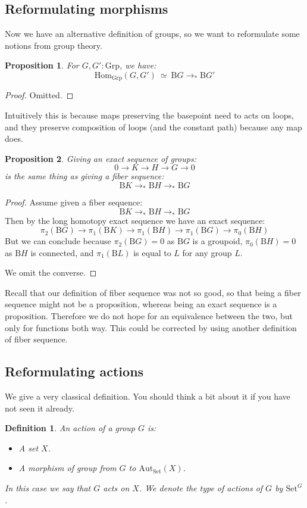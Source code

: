 \documentclass{article}
\newcommand{\sse}[1]{\medbreak \subsection{#1}}
\renewcommand{\r}{\rightarrow}
\newcommand{\Grp}{\mathrm{Grp}}
\newcommand{\Hom}{\mathrm{Hom}}
\newcommand{\B}{\mathrm{B}}
\newcommand{\Aut}{\mathrm{Aut}}
\newcommand{\Set}{\mathrm{Set}}
\newtheorem{definition}{Definition}
\newtheorem{proposition}{Proposition}
\begin{document}
\sse{Reformulating morphisms}

Now we have an alternative definition of groups, so we want to reformulate some notions from group theory.

\begin{proposition}
For $G,G':\Grp$, we have:
\[\Hom_\Grp(G,G') \ \simeq \ \B G\r_* \B G'\]
\end{proposition}
\begin{proof}
Omitted.
\end{proof}

Intuitively this is because maps preserving the basepoint need to acts on loops, and they preserve composition of loops (and the constant path) because any map does.

\begin{proposition}
Giving an exact sequence of groups:
\[0\r K \r H\r  G\r 0 \]
is the same thing as giving a fiber sequence:
\[\B K \r_*\B H\r_*\B G\]
\end{proposition}
\begin{proof}
Assume given a fiber sequence:
\[\B K \r_*\B H\r_*\B G\]
Then by the long homotopy exact sequence we have an exact sequence:
\[\pi_2(\B G)\r \pi_1(\B K) \r \pi_1(\B H) \r \pi_1(\B G) \r \pi_0(\B H)\]
But we can conclude because $\pi_2(\B G) = 0$ as $\B G$ is a groupoid, $\pi_0(\B H) = 0$ as $\B H$ is connected, and $\pi_1(\B L)$ is equal to $L$ for any group $L$.
 
We omit the converse.
\end{proof}

Recall that our definition of fiber sequence was not so good, so that being a fiber sequence might not be a proposition, whereas being an exact sequence is a proposition. Therefore we do not hope for an equivalence between the two, but only for functions both way. This could be corrected by using another definition of fiber sequence.



\sse{Reformulating actions}

We give a very classical definition. You should think a bit about it if you have not seen it already.

\begin{definition}
An action of a group $G$ is:
\begin{itemize}
\item A set $X$.
\item A morphism of group from $G$ to $\Aut_\Set(X)$.
\end{itemize}
In this case we say that $G$ acts on $X$. We denote the type of actions of $G$ by $\Set^G$.
\end{definition}
\end{document}
